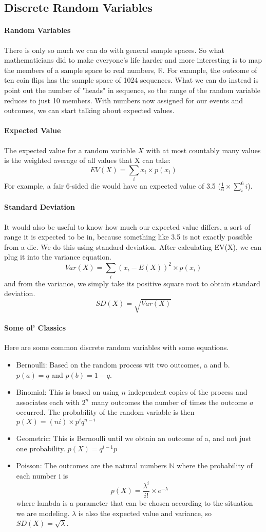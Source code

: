 \subsection{Discrete Random Variables} 
\paragraph{Random Variables}There is only so much we can do with general sample spaces. So what mathematicians did to make everyone's life harder and more interesting is to map the members of a sample space to real numbers, $\mathbb{R}$. For example, the outcome of ten coin flips has the sample space of 1024 sequences. What we can do instead is point out the number of "heads" in sequence, so the range of the random variable reduces to just 10 members. With numbers now assigned for our events and outcomes, we can start talking about expected values.
\paragraph{Expected Value} The expected value for a random variable $X$ with at most countably many values is the weighted average of all values that X can take: \[ EV(X) = \sum_{i}x_i \times p(x_i) \] For example, a fair 6-sided die would have an expected value of 3.5 ($\frac{1}{6} \times \sum_i^6 i$).
\paragraph{Standard Deviation} It would also be useful to know how much our expected value differs, a sort of range it is expected to be in, because something like 3.5 is not exactly possible from a die. We do this using standard deviation. After calculating EV(X), we can plug it into the variance equation. \[Var(X) = \sum_{i} (x_i - E(X))^2 \times p(x_i)\] and from the variance, we simply take its positive square root to obtain standard deviation. \[SD(X) = \sqrt{Var(X)}\]
\paragraph{Some ol' Classics} Here are some common discrete random variables with some equations.
\begin{itemize}
	\item Bernoulli: Based on the random process wit two outcomes, a and b. $p(a) = q$ and $p(b) = 1 - q$.
	\item Binomial: This is based on using $n$ independent copies of the process and associates each with $2^n$ many outcomes the number of times the outcome $a$ occurred. The probability of the random variable is then $p(X) = (n i) \times p^iq^{n-i}$
	\item Geometric: This is Bernoulli until we obtain an outcome of a, and not just one probability. $p(X) = q^{i-1}p$
	\item Poisson: The outcomes are the natural numbers $\mathbb{N}$ where the probability of each number i is \[ p(X) = \frac{\lambda^i}{i!} \times e^{-\lambda}\] where lambda is a parameter that can be chosen according to the situation we are modeling. $\lambda$ is also the expected value and variance, so $SD(X) = \sqrt{\lambda}$.
\end{itemize}

